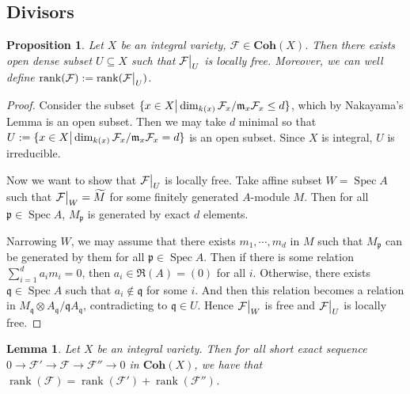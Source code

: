 \documentclass{ctexart}
\newtheorem{proposition}{Proposition}[section]
\newtheorem{lemma}{Lemma}[section]
\newcommand{\rank}{\operatorname{rank}}
\newcommand{\spec}{\operatorname{Spec}}
\newcommand{\coherent}{\mathbf{Coh}}
\begin{document}
\subsection{Divisors}
\label{subsection:Riemann-Roch_Formula_Divisors}

\begin{proposition}
    Let $X$ be an integral variety, $\mathcal{F}\in \coherent (X)$.
    Then there exists open dense subset $U \subseteq X$ such that $\mathcal{F}\big{|}_{U}$ is locally free.
    Moreover, we can well define $\rank (\mathcal{F}) := \rank (\mathcal{F}\big{|}_{U})$.
    \label{Proposition 3.1}
\end{proposition}
\begin{proof}
    Consider the subset $\{x\in X \big{|} \dim_{k(x)} \mathcal{F}_{x}/\mathfrak{m}_{x}\mathcal{F}_{x} \le d\}$,
    which by Nakayama's Lemma is an open subset.
    Then we may take $d$ minimal so that $U := \{x\in X \big{|} \dim_{k(x)} \mathcal{F}_{x}/\mathfrak{m}_{x}\mathcal{F}_{x} = d\}$ is an open subset.
    Since $X$ is integral, $U$ is irreducible.
    \par
    Now we want to show that $\mathcal{F}\big{|}_{U}$ is locally free.
    Take affine subset $W = \spec A$ such that $\mathcal{F}\big{|}_{W} = \widetilde{M}$ for some finitely generated $A$-module $M$.
    Then for all $\mathfrak{p}\in \spec A$, $M_{\mathfrak{p}}$ is generated by exact $d$ elements.
    \par
    Narrowing $W$, we may assume that there exists $m_{1}, \cdots, m_{d}$ in $M$ such that $M_{\mathfrak{p}}$ can be generated by them for all $\mathfrak{p}\in \spec A$.
    Then if there is some relation $\sum_{i = 1}^{d} a_{i}m_{i} = 0$,
    then $a_{i}\in \mathfrak{R}(A) = (0)$ for all $i$.
    Otherwise, there exists $\mathfrak{q}\in \spec A$ such that $a_{i}\notin \mathfrak{q}$ for some $i$.
    And then this relation becomes a relation in $M_{\mathfrak{q}} \otimes A_{\mathfrak{q}}/\mathfrak{q}A_{\mathfrak{q}}$, contradicting to $\mathfrak{q}\in U$.
    Hence $\mathcal{F}\big{|}_{W}$ is free and $\mathcal{F}\big{|}_{U}$ is locally free.
\end{proof}
\begin{lemma}
    Let $X$ be an integral variety.
    Then for all short exact sequence $0 \rightarrow \mathcal{F}' \rightarrow \mathcal{F} \rightarrow \mathcal{F}'' \rightarrow 0$ in $\coherent (X)$,
    we have that $\rank (\mathcal{F}) = \rank (\mathcal{F}') + \rank (\mathcal{F}'')$.
    \label{Lemma 3.2}
\end{lemma}
\end{document}
